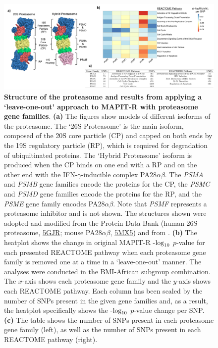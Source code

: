 \documentclass[10pt,a4paper]{article}
\def\log{{\rm log}}
\begin{document}
\begin{figure}[htbp]
\centering
\hspace*{-2.5cm}
\includegraphics[scale=.55]{Images/Main/InterPath_Main_Figure_Proteasome_vs2.png}
\caption[TBD]{\textbf{Structure of the proteasome and results from applying a `leave-one-out' approach to MAPIT-R with proteasome gene families}. \textbf{(a)} The figures show models of different isoforms of the proteasome. The `26S Proteasome' is the main isoform, composed of the 20S core particle (CP) and capped on both ends by  the 19S regulatory particle (RP), which is required for degradation of ubiquitinated proteins. The `Hybrid Proteasome' isoform is produced when the CP binds on one end with a RP and on the other end with the IFN-$\gamma$-inducible complex PA28$\alpha\beta$. The \textit{PSMA} and \textit{PSMB} gene families encode the proteins for the CP, the \textit{PSMC} and \textit{PSMD} gene families encode the proteins for the RP, and the \textit{PSME} gene family encodes PA28$\alpha\beta$. Note that \textit{PSMF} represents a proteasome inhibitor and is not shown. The structures shown were adopted and modified from the Protein Data Bank (human 26S proteasome, \href{https://www.rcsb.org/structure/5GJR}{5GJR}; mouse PA28$\alpha\beta$, \href{https://www.rcsb.org/structure/5MX5}{5MX5}) and from \cite{Murata2018}. \textbf{(b)} The heatplot shows the change in original MAPIT-R -$\log_{10}$ $p$-value for each presented REACTOME pathway when each proteasome gene family is removed one at a time in a `leave-one-out' manner. The analyses were conducted in the BMI-African subgroup combination. The $x$-axis shows each proteasome gene family and the $y$-axis shows each REACTOME pathway. Each column has been scaled by the number of SNPs present in the given gene families and, as a result, the heatplot specifically shows the -$\log_{10}$ $p$-value change per SNP. \textbf{(c)} The table shows the number of SNPs present in each proteasome gene family (left), as well as the number of SNPs present in each REACTOME pathway (right).}
\label{InterPath-Main-Figure-Proteasome-Panels}
\end{figure} 
 
\end{document}
